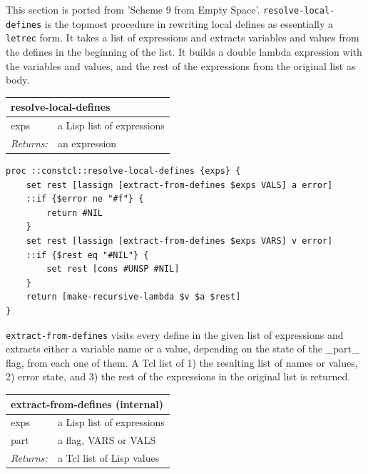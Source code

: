 \documentclass[twoside,9pt]{report}
\begin{document}
This section is ported from 'Scheme 9 from Empty Space'. \texttt{resolve-local-defines} is the topmost procedure in rewriting local defines as essentially a \texttt{letrec} form. It takes a list of expressions and extracts variables and values from the defines in the beginning of the list. It builds a double lambda expression with the variables and values, and the rest of the expressions from the original list as body.

\begin{tabular}{ |l l| }
\hline
\multicolumn{2}{|l|}{resolve-local-defines} \\
\hline
exps & a Lisp list of expressions \\
\textit{Returns:} & an expression \\
\hline
\end{tabular}

\noindent\makebox[\linewidth]{\rule{\linewidth}{0.4pt}}
\begin{lstlisting}
proc ::constcl::resolve-local-defines {exps} {
    set rest [lassign [extract-from-defines $exps VALS] a error]
    ::if {$error ne "#f"} {
        return #NIL
    }
    set rest [lassign [extract-from-defines $exps VARS] v error]
    ::if {$rest eq "#NIL"} {
        set rest [cons #UNSP #NIL]
    }
    return [make-recursive-lambda $v $a $rest]
}
\end{lstlisting}
\noindent\makebox[\linewidth]{\rule{\linewidth}{0.4pt}}

\texttt{extract-from-defines} visits every define in the given list of expressions and extracts either a variable name or a value, depending on the state of the \_part\_ flag, from each one of them. A Tcl list of 1) the resulting list of names or values, 2) error state, and 3) the rest of the expressions in the original list is returned.

\begin{tabular}{ |l l| }
\hline
\multicolumn{2}{|l|}{extract-from-defines (internal)} \\
\hline
exps & a Lisp list of expressions \\
part & a flag, VARS or VALS \\
\textit{Returns:} & a Tcl list of Lisp values \\
\hline
\end{tabular}
\end{document}
